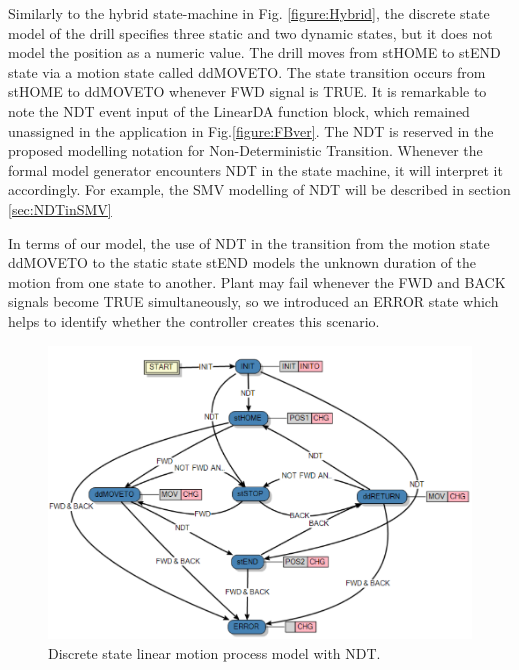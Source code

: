 \documentclass[conference]{IEEEtran}
\begin{document}
Similarly to the hybrid state-machine in Fig. \ref{figure:Hybrid}, the discrete state model of the drill specifies  three static and two dynamic states, but it does not model the position as a numeric value. The drill moves from {stHOME} to {stEND} state via a motion state called {ddMOVETO}. The state transition occurs from stHOME to ddMOVETO whenever FWD signal is TRUE. 
It is remarkable to note the NDT event input of the LinearDA function block, which remained unassigned in the application in Fig.\ref{figure:FBver}.
The NDT is reserved in the proposed modelling notation for Non-Deterministic Transition. 
Whenever the formal model generator encounters NDT in the state machine, it will interpret it accordingly. For example, the SMV modelling of NDT will be described in section \ref{sec:NDTinSMV} 

In terms of our model, the use of NDT in the transition from the motion state {ddMOVETO} to the static state {stEND} models the unknown duration of the motion from one state to another. Plant may fail whenever the {FWD} and {BACK} signals become {TRUE} simultaneously, so we introduced an ERROR state which helps to identify whether the controller creates this scenario.



\begin{figure}
    \centering
    \includegraphics[scale = 0.4]{images/LinearDAFinal.PNG}
    \caption{Discrete state linear motion process model with NDT. }
    \label{figure:DrillECC}
\end{figure}
\end{document}
